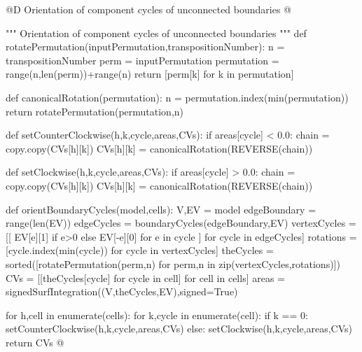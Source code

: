 \documentclass[11pt,oneside]{article}    %
\begin{document}
@D Orientation of component cycles of unconnected boundaries 
@{""" Orientation of component cycles of unconnected boundaries """
def rotatePermutation(inputPermutation,transpositionNumber):
    n = transpositionNumber
    perm = inputPermutation
    permutation = range(n,len(perm))+range(n) 
    return [perm[k] for k in permutation]

def canonicalRotation(permutation):
    n = permutation.index(min(permutation))
    return rotatePermutation(permutation,n)

def setCounterClockwise(h,k,cycle,areas,CVs):
    if areas[cycle] < 0.0: 
        chain = copy.copy(CVs[h][k])
        CVs[h][k] = canonicalRotation(REVERSE(chain))

def setClockwise(h,k,cycle,areas,CVs):
    if areas[cycle] > 0.0: 
        chain = copy.copy(CVs[h][k])
        CVs[h][k] = canonicalRotation(REVERSE(chain))

def orientBoundaryCycles(model,cells):
    V,EV = model
    edgeBoundary = range(len(EV))
    edgeCycles = boundaryCycles(edgeBoundary,EV)
    vertexCycles = [[ EV[e][1] if e>0 else EV[-e][0] for e in cycle ] for cycle in edgeCycles]
    rotations = [cycle.index(min(cycle)) for cycle in vertexCycles]
    theCycles = sorted([rotatePermutation(perm,n) for perm,n in zip(vertexCycles,rotations)])
    CVs = [[theCycles[cycle] for cycle in cell] for cell in cells]
    areas = signedSurfIntegration((V,theCycles,EV),signed=True)
    
    for h,cell in enumerate(cells):
        for k,cycle in enumerate(cell):
            if k == 0: setCounterClockwise(h,k,cycle,areas,CVs)
            else: setClockwise(h,k,cycle,areas,CVs)
    return CVs
@}
\end{document}
